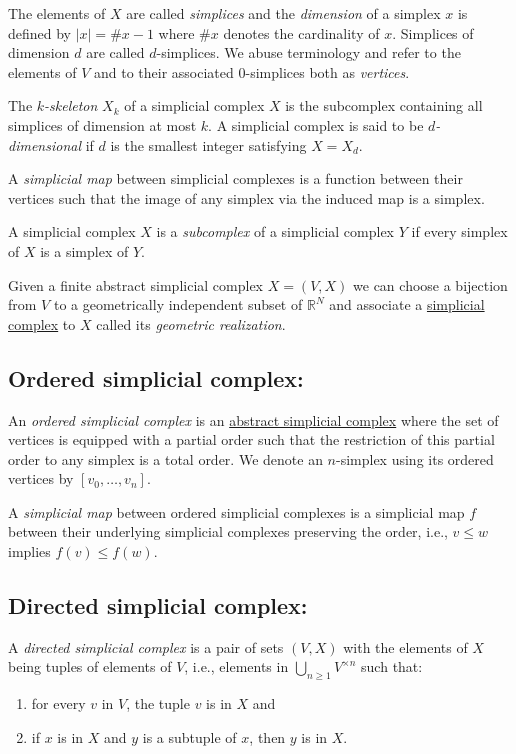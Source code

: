 \documentclass{amsart}
\begin{document}
	The elements of $X$ are called \textit{simplices} and the \textit{dimension} of a simplex $x$ is defined by $|x| = \# x - 1$ where $\# x$ denotes the cardinality of $x$. Simplices of dimension $d$ are called $d$-simplices. We abuse terminology and refer to the elements of $V$ and to their associated $0$-simplices both as \textit{vertices}.
	
	The \textit{$k$-skeleton }$X_k$ of a simplicial complex $X$ is the subcomplex containing all simplices of dimension at most $k$. A simplicial complex is said to be \textit{$d$-dimensional} if $d$ is the smallest integer satisfying $X = X_d$.
	
	A \textit{simplicial map} between simplicial complexes is a function between their vertices such that the image of any simplex via the induced map is a simplex.
	
	A simplicial complex $X$ is a \textit{subcomplex} of a simplicial complex $Y$ if every simplex of $X$ is a simplex of $Y$.

	Given a finite abstract simplicial complex $X = (V, X)$ we can choose a bijection from $V$ to a geometrically independent subset of $\mathbb R^N$ and associate a \hyperref[simplicial complex]{simplicial complex} to $X$ called its \textit{geometric realization}.
	
	\subsection*{Ordered simplicial complex:} \label{ordered simplical complex}
	
	An \textit{ordered simplicial complex} is an \hyperref[abstract simplicial complex]{abstract simplicial complex} where the set of vertices is equipped with a partial order such that the restriction of this partial order to any simplex is a total order. We denote an $n$-simplex using its ordered vertices by $[v_0, \dots, v_n]$.
	
	A \textit{simplicial map} between ordered simplicial complexes is a simplicial map $f$ between their underlying simplicial complexes preserving the order, i.e., $v \leq w$ implies $f(v) \leq f(w)$.
	
	\subsection*{Directed simplicial complex:}  \label{directed simplicial complex}
	
	A \textit{directed simplicial complex} is a pair of sets $(V, X)$ with the elements of $X$ being tuples of elements of $V$, i.e., elements in $\bigcup_{n\geq1} V^{\times n}$ such that: 
	\begin{enumerate}
		\item for every $v$ in $V$, the tuple $v$ is in $X$ and
		\item if $x$ is in $X$ and $y$ is a subtuple of $x$, then $y$ is in $X$. 
	\end{enumerate}
\end{document}
